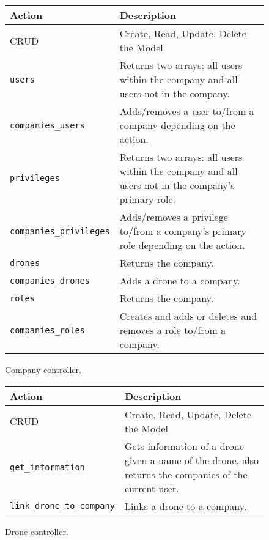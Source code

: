 \begin{figure}[htb]
\begin{center}
\begin{tabular}{ | l | p{8cm} | }
  \hline
    \textbf{Action} & \textbf{Description} \\ \hline
    CRUD & Create, Read, Update, Delete the Model \\ \hline
    \verb+users+ & Returns two arrays: all users within the company and all users not in the company.\\ \hline
    \verb+companies_users+ & Adds/removes a user to/from a company depending on the action.\\ \hline
    \verb+privileges+ & Returns two arrays: all users within the company and all users not in the company's primary role.\\ \hline
    \verb+companies_privileges+ & Adds/removes a privilege to/from a company's primary role depending on the action.\\ \hline
    \verb+drones+ & Returns the company.\\ \hline
    \verb+companies_drones+ & Adds a drone to a company.\\ \hline
    \verb+roles+ & Returns the company.\\ \hline
    \verb+companies_roles+ & Creates and adds or deletes and removes a role to/from a company.\\ \hline
\end{tabular}
\caption{Company controller.}
\label{tab:company_controller_actions}
\end{center}
\end{figure}

\begin{figure}[htb]
\begin{center}
\begin{tabular}{ | l | p{8cm} | }
  \hline
    \textbf{Action} & \textbf{Description} \\ \hline
    CRUD & Create, Read, Update, Delete the Model \\ \hline
    \verb+get_information+ & Gets information of a drone given a name of the drone, also returns the companies of the current user.\\ \hline
    \verb+link_drone_to_company+ & Links a drone to a company.\\ \hline
\end{tabular}
\caption{Drone controller.}
\label{tab:drone_controller_actions}
\end{center}
\end{figure}

